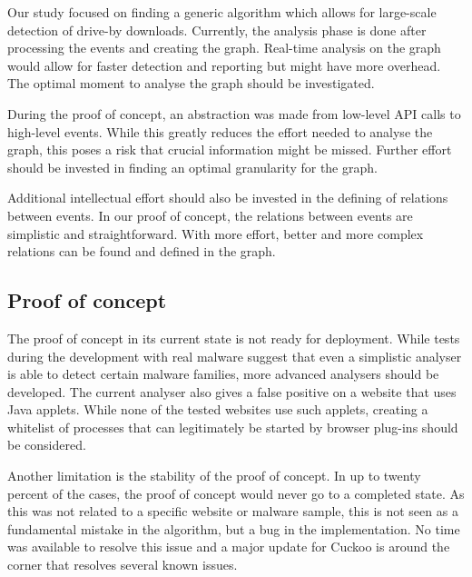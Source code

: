 Our study focused on finding a generic algorithm which allows for large-scale detection of drive-by downloads. Currently, the analysis phase is done after processing the events and creating the graph. Real-time analysis on the graph would allow for faster detection and reporting but might have more overhead. The optimal moment to analyse the graph should be investigated.

During the proof of concept, an abstraction was made from low-level API calls to high-level events. While this greatly reduces the effort needed to analyse the graph, this poses a risk that crucial information might be missed. Further effort should be invested in finding an optimal granularity for the graph.

Additional intellectual effort should also be invested in the defining of relations between events. In our proof of concept, the relations between events are simplistic and straightforward. With more effort, better and more complex relations can be found and defined in the graph.

\subsection{Proof of concept}

The proof of concept in its current state is not ready for deployment. While tests during the development with real malware suggest that even a simplistic analyser is able to detect certain malware families, more advanced analysers should be developed. The current analyser also gives a false positive on a website that uses Java applets. While none of the tested websites use such applets, creating a whitelist of processes that can legitimately be started by browser plug-ins should be considered.

Another limitation is the stability of the proof of concept. In up to twenty percent of the cases, the proof of concept would never go to a completed state. As this was not related to a specific website or malware sample, this is not seen as a fundamental mistake in the algorithm, but a bug in the implementation. No time was available to resolve this issue and a major update for Cuckoo is around the corner that resolves several known issues.
